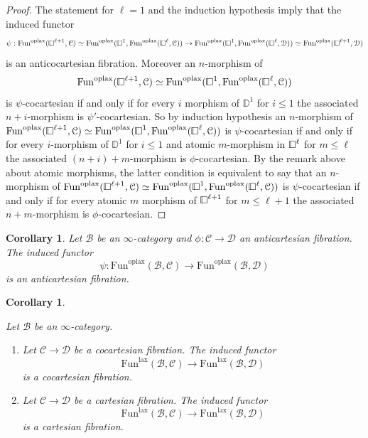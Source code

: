 \documentclass[10pt,oneside]{article}
\numberwithin{equation}{section} %
\numberwithin{figure}{section} %
\theoremstyle{plain}
\newtheorem{corollary}[theorem]{Corollary}
\theoremstyle{definition}
\newcommand{\bD}{{\mathbb D}}
\newcommand{\mB}{{\mathcal B}}
\newcommand{\mC}{{\mathcal C}}
\newcommand{\mD}{{\mathcal D}}
\newcommand{\n}{{n}}
\newcommand{\Fun}{\mathrm{Fun}}
\newcommand{\lax}{{\mathrm{lax}}}
\newcommand{\oplax}{{\mathrm{oplax}}}
\newcommand{\cube}{{\,\vline\negmedspace\square}}
\begin{document}
\begin{proof}
The statement for $\ell=1$ and the induction hypothesis imply that the induced functor
$$\psi: \Fun^\oplax(\cube^{\ell+1}, \mC) \simeq \Fun^\oplax(\cube^1, \Fun^\oplax(\cube^{\ell}, \mC)) \to \Fun^\oplax(\cube^1,\Fun^\oplax(\cube^{\ell}, \mD)) \simeq \Fun^\oplax(\cube^{\ell+1}, \mD) $$
is an anticocartesian fibration.
Moreover an $\n$-morphism of $$\Fun^\oplax(\cube^{\ell+1}, \mC) \simeq \Fun^\oplax(\cube^1, \Fun^\oplax(\cube^{\ell}, \mC)) $$ is $\psi$-cocartesian if and only if for every $i$ morphism of $\bD^1$ for $ i \leq 1 $ the associated $n + i$-morphism is $\psi' $-cocartesian.
So by induction hypothesis an $\n$-morphism of $\Fun^\oplax(\cube^{\ell+1}, \mC) \simeq \Fun^\oplax(\cube^1, \Fun^\oplax(\cube^{\ell}, \mC)) $ is $\psi$-cocartesian if and only if for every $i$-morphism of $\bD^1$ for $ i \leq 1 $ and atomic $m$-morphism in $\cube^{\ell}$ for $m \leq \ell$ the associated $(n +i) + m $-morphism is $\phi$-cocartesian. 
By the remark above about atomic morphisms,
the latter condition is equivalent to say that an $\n$-morphism of $\Fun^\oplax(\cube^{\ell+1}, \mC) \simeq \Fun^\oplax(\cube^1, \Fun^\oplax(\cube^{\ell}, \mC)) $ is $\psi$-cocartesian if and only if for every atomic $m$ morphism of $\cube^{\ell+1}$ for $m \leq \ell+1$ the associated $n + m $-morphism is $\phi$-cocartesian. 
\end{proof}

\begin{corollary}\label{induoplax}
Let $\mB$ be an $\infty$-category and $\phi: \mC \to \mD$ an anticartesian fibration. The induced functor
$$\psi: \Fun^\oplax(\mB, \mC) \to \Fun^\oplax(\mB, \mD) $$
is an anticartesian fibration.

\end{corollary}

\begin{corollary}\label{indulax}

Let $\mB$ be an $\infty$-category.

\begin{enumerate}[\normalfont(1)]\setlength{\itemsep}{-2pt}
   
\item Let $\mC \to \mD$ be a cocartesian fibration. The induced functor
$$\Fun^\lax(\mB, \mC) \to \Fun^\lax(\mB, \mD) $$
is a cocartesian fibration.
  
\item Let $\mC \to \mD$ be a cartesian fibration. The induced functor
$$\Fun^\lax(\mB, \mC) \to \Fun^\lax(\mB, \mD) $$
is a cartesian fibration.

\end{enumerate}
  
\end{corollary}
\end{document}
